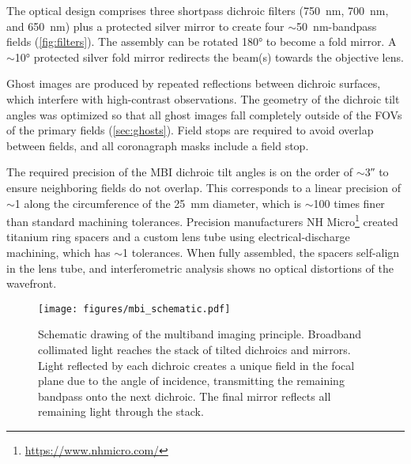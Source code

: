 The optical design comprises three shortpass dichroic filters (\SI{750}{\nano\meter}, \SI{700}{\nano\meter}, and \SI{650}{\nano\meter}) plus a protected silver mirror to create four $\sim$\SI{50}{\nano\meter}-bandpass fields (\autoref{fig:filters}). The assembly can be rotated \ang{180} to become a fold mirror. A $\sim$\ang{10} protected silver fold mirror redirects the beam(s) towards the objective lens.

Ghost images are produced by repeated reflections between dichroic surfaces, which interfere with high-contrast observations. The geometry of the dichroic tilt angles was optimized so that all ghost images fall completely outside of the FOVs of the primary fields (\autoref{sec:ghosts}). Field stops are required to avoid overlap between fields, and all coronagraph masks include a field stop.

The required precision of the MBI dichroic tilt angles is on the order of $\sim$\ang{;;3} to ensure neighboring fields do not overlap. This corresponds to a linear precision of $\sim$\SI{1}{\micron} along the circumference of the \SI{25}{\milli\meter} diameter, which is $\sim$100 times finer than standard machining tolerances. Precision manufacturers NH Micro\footnote{\url{https://www.nhmicro.com/}} created titanium ring spacers and a custom lens tube using electrical-discharge machining, which has $\sim$\SI{1}{\micron} tolerances. When fully assembled, the spacers self-align in the lens tube, and interferometric analysis shows no optical distortions of the wavefront. 

\begin{figure}
    \centering
    \texttt{[image: figures/mbi\_schematic.pdf]}
    \caption{Schematic drawing of the multiband imaging principle. Broadband collimated light reaches the stack of tilted dichroics and mirrors. Light reflected by each dichroic creates a unique field in the focal plane due to the angle of incidence, transmitting the remaining bandpass onto the next dichroic. The final mirror reflects all remaining light through the stack.\label{fig:mbi_schematic}}
\end{figure}


